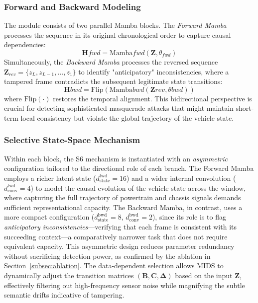 \documentclass[lettersize,journal]{IEEEtran}
\begin{document}
\subsubsection{Forward and Backward Modeling} The module consists of two parallel Mamba blocks. The \textit{Forward Mamba} processes the sequence in its original chronological order to capture causal dependencies:
\begin{equation}
\mathbf{H}{fwd} = \text{Mamba}{fwd}(\mathbf{Z}, \theta_{fwd})
\end{equation}
Simultaneously, the \textit{Backward Mamba} processes the reversed sequence $\mathbf{Z}_{rev} = \{z_L, z_{L-1}, \dots, z_1\}$ to identify "anticipatory" inconsistencies, where a tampered frame contradicts the subsequent legitimate state transitions:
\begin{equation}
\mathbf{H}{bwd} = \text{Flip}(\text{Mamba}{bwd}(\mathbf{Z}{rev}, \theta{bwd}))
\end{equation}
where $\text{Flip}(\cdot)$ restores the temporal alignment. This bidirectional perspective is crucial for detecting sophisticated masquerade attacks that might maintain short-term local consistency but violate the global trajectory of the vehicle state.

\subsubsection{Selective State-Space Mechanism}
Within each block, the S6 mechanism is instantiated with an
\emph{asymmetric} configuration tailored to the directional role of
each branch. The Forward Mamba employs a richer latent state
($d_{\text{state}}^{\text{fwd}} = 16$) and a wider internal
convolution ($d_{\text{conv}}^{\text{fwd}} = 4$) to model the causal
evolution of the vehicle state across the window, where capturing the
full trajectory of powertrain and chassis signals demands sufficient
representational capacity. The Backward Mamba, in contrast, uses a
more compact configuration ($d_{\text{state}}^{\text{bwd}} = 8$,
$d_{\text{conv}}^{\text{bwd}} = 2$), since its role is to flag
\emph{anticipatory inconsistencies}---verifying that each frame is
consistent with its succeeding context---a comparatively narrower task
that does not require equivalent capacity. This asymmetric design
reduces parameter redundancy without sacrificing detection power, as
confirmed by the ablation in Section~\ref{subsec:ablation}. The
data-dependent selection allows MIDS to dynamically adjust the
transition matrices $(\mathbf{B}, \mathbf{C}, \boldsymbol{\Delta})$
based on the input $\mathbf{Z}$, effectively filtering out
high-frequency sensor noise while magnifying the subtle semantic
drifts indicative of tampering.
\end{document}
